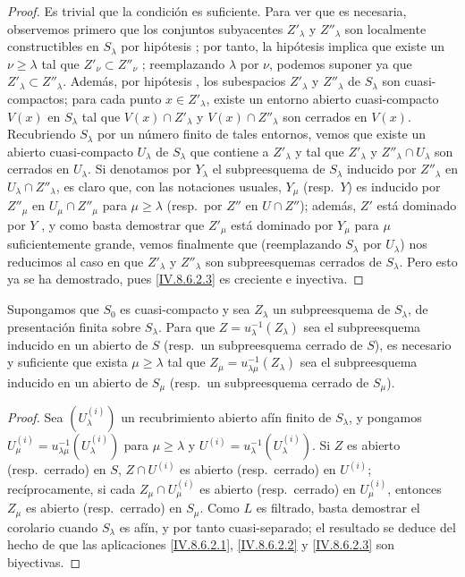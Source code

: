\begin{proof}
Es trivial que la condición es suficiente.
Para ver que es necesaria, observemos primero que los conjuntos subyacentes $Z'_\lambda$ y $Z''_\lambda$ son localmente constructibles en $S_\lambda$ por hipótesis ; por tanto, la hipótesis implica que existe un $\nu\geqslant\lambda$ tal que $Z'_\nu\subset Z''_\nu$ ; reemplazando $\lambda$ por $\nu$, podemos suponer ya que $Z'_\lambda\subset Z''_\lambda$.
Además, por hipótesis , los subespacios $Z'_\lambda$ y $Z''_\lambda$ de $S_\lambda$ son cuasi-compactos; para cada punto $x\in Z'_\lambda$, existe un entorno abierto cuasi-compacto $V(x)$ en $S_\lambda$ tal que $V(x)\cap Z'_\lambda$ y $V(x)\cap Z''_\lambda$ son cerrados en $V(x)$.
Recubriendo $S_\lambda$ por un número finito de tales entornos, vemos que existe un abierto cuasi-compacto $U_\lambda$ de $S_\lambda$ que contiene a $Z'_\lambda$ y tal que $Z'_\lambda$ y $Z''_\lambda\cap U_\lambda$ son cerrados en $U_\lambda$.
Si denotamos por $Y_\lambda$ el subpreesquema de $S_\lambda$ inducido por $Z''_\lambda$ en $U_\lambda\cap Z''_\lambda$, es claro que, con las notaciones usuales, $Y_\mu$ (resp.\ $Y$) es inducido por $Z''_\mu$ en $U_\mu\cap Z''_\mu$ para $\mu\geqslant\lambda$ (resp.\ por $Z''$ en $U\cap Z''$); además, $Z'$ está dominado por $Y$ , y como basta demostrar que $Z'_\mu$ está dominado por $Y_\mu$ para $\mu$
 suficientemente grande, vemos finalmente que (reemplazando $S_\lambda$ por $U_\lambda$) nos reducimos al caso en que $Z'_\lambda$ y $Z''_\lambda$ son subpreesquemas cerrados de $S_\lambda$.
Pero esto ya se ha demostrado, pues \eqref{IV.8.6.2.3} es creciente e inyectiva.
\end{proof}

\begin{corollary}[8.6.4]
\label{IV.8.6.4}
Supongamos que $S_0$ es cuasi-compacto y sea $Z_\lambda$ un subpreesquema de $S_\lambda$, de presentación finita sobre $S_\lambda$.
Para que $Z=u_\lambda^{-1}(Z_\lambda)$ sea el subpreesquema inducido en un abierto de $S$ (resp.\ un subpreesquema cerrado de $S$), es necesario y suficiente que exista $\mu\geqslant\lambda$ tal que $Z_\mu=u_{\lambda\mu}^{-1}(Z_\lambda)$ sea el subpreesquema inducido en un abierto de $S_\mu$ (resp.\ un subpreesquema cerrado de $S_\mu$).
\end{corollary}

\begin{proof}
Sea $(U_\lambda^{(i)})$ un recubrimiento abierto afín finito de $S_\lambda$, y pongamos $U^{(i)}_\mu=u_{\lambda\mu}^{-1}(U_\lambda^{(i)})$ para $\mu\geqslant\lambda$ y $U^{(i)}=u_\lambda^{-1}(U_\lambda^{(i)})$.
Si $Z$ es abierto (resp.\ cerrado) en $S$, $Z\cap U^{(i)}$ es abierto (resp.\ cerrado) en $U^{(i)}$; recíprocamente, si cada $Z_\mu\cap U^{(i)}_\mu$ es abierto (resp.\ cerrado) en $U^{(i)}_\mu$, entonces $Z_\mu$ es abierto (resp.\ cerrado) en $S_\mu$.
Como $L$ es filtrado, basta demostrar el corolario cuando $S_\lambda$ es afín, y por tanto cuasi-separado; el resultado se deduce del hecho de que las aplicaciones \eqref{IV.8.6.2.1}, \eqref{IV.8.6.2.2} y \eqref{IV.8.6.2.3} son biyectivas.
\end{proof}

